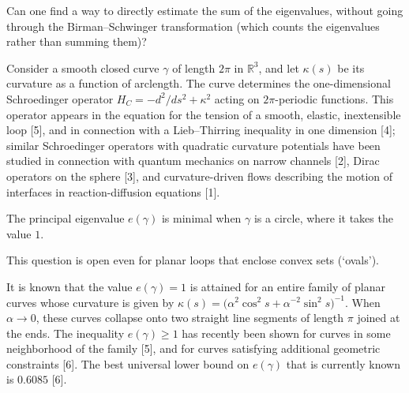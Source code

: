 \documentclass[12pt,letterpaper, reqno]{amsart}
\begin{document}
\begin{problemblock}
\begin{problem}[2.33] 
Can one find a way to directly
estimate the sum of the eigenvalues, without going through the
Birman--Schwinger transformation (which counts the
eigenvalues rather than summing them)?
\end{problem}
\end{problemblock}

\begin{problemblock} 
Consider a smooth closed curve $\gamma$ of length $2\pi$ in
${\mathbb R}^3$, and let  $\kappa(s)$ be its curvature as a function
of arclength. The curve determines the one-dimensional Schroedinger
operator $H_C=-d^2/ds^2 + \kappa^2$ acting on $2\pi$-periodic
functions. This operator appears in the equation for the tension of
a smooth, elastic, inextensible loop [5], and in connection with a
Lieb--Thirring inequality in one dimension [4]; similar
Schroedinger operators with quadratic curvature potentials have
been studied in connection with quantum mechanics on narrow channels
[2], Dirac operators on the sphere [3], and curvature-driven flows
describing the motion of interfaces in reaction-diffusion
equations [1].

\begin{conjecture}[2.4]
The principal eigenvalue $e(\gamma)$ is
minimal when $\gamma$ is a circle, where it takes the value $1$.
\end{conjecture}

\begin{distinguishedremark}
This question is open even for planar loops that enclose convex sets
(`ovals').
\end{distinguishedremark}

\begin{remark}
 It is known that the value $e(\gamma)=1$ is
attained for an entire family of planar curves whose curvature is
given by $\kappa(s) = \bigl(\alpha^2\cos^2 s + \alpha^{-2}\sin^2 s
\bigr)^{-1}$. When $\alpha\to 0$, these curves collapse onto two
straight line segments of length $\pi$ joined at the ends. The
inequality $e(\gamma)\ge 1$ has recently been shown for curves in
some neighborhood of the family [5], and for curves satisfying
additional geometric constraints [6]. The best universal lower bound
on $e(\gamma)$ that is currently known is $0.6085$ [6].

\end{remark}


\end{problemblock}
\end{document}
